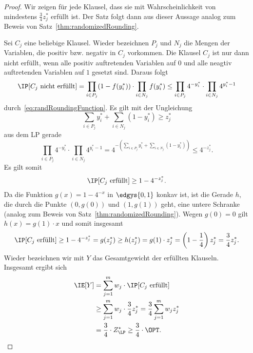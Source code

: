 \documentclass[language=ngerman,algolist]{TemplateLecture}
\begin{document}
\begin{proof}
    Wir zeigen für jede Klausel, dass sie mit Wahrscheinlichkeit von mindestens $\frac{3}{4}z_j^*$ erfüllt ist. Der Satz folgt dann aus dieser Aussage analog zum Beweis von Satz~\ref{thm:randomizedRounding}.

    Sei $C_j$ eine beliebige Klausel. Wieder bezeichnen $P_j$ und $N_j$ die Mengen der Variablen, die positiv bzw. negativ in $C_j$ vorkommen. Die Klausel $C_j$ ist nur dann nicht erfüllt, wenn alle positiv auftretenden Variablen auf $0$ und alle neagtiv auftretenden Variablen auf $1$ gesetzt sind. Daraus folgt 
    \begin{equation*}
        \IP[\text{$C_j$ nicht erfüllt}] = \prod_{i \in P_j} (1 - f(y_i^*)) \cdot \prod_{i \in N_j} f(y_i^*) \leq \prod_{i \in P_j} 4^{-y_i^*} \cdot \prod_{i \in N_j} 4^{y_i^* - 1}
    \end{equation*}
    durch~\eqref{eq:randRoundingFunction}. Es gilt mit der Ungleichung
    \begin{equation*}
        \sum_{i \in P_j} y_i^* + \sum_{i \in N_j} (1 - y_i^*) \geq z_j^*
    \end{equation*}
    aus dem LP gerade 
    \begin{equation*}
        \prod_{i \in P_j} 4^{-y_i^*} \cdot \prod_{i \in N_j} 4^{y_i^* - 1} = 4^{-\left( \sum_{i \in P_j} y_i^* + \sum_{i \in N_j} (1 - y_i^*) \right)} \leq 4^{-z_j^*}.
    \end{equation*}
    Es gilt somit 
    \begin{equation*}
        \IP[\text{$C_j$ erfüllt}] \geq 1 - 4^{-z_j^*}.
    \end{equation*}
    Da die Funktion $g(x) = 1 - 4^{-x}$ in $\edgys{0,1}$ konkav ist, ist die Gerade $h$, die durch die Punkte $(0, g(0))$ und $(1, g(1))$ geht, eine untere Schranke (analog zum Beweis von Satz~\ref{thm:randomizedRounding}). Wegen $g(0) = 0$ gilt $h(x) = g(1) \cdot x$ und somit insgesamt 
    \begin{equation*}
        \IP[\text{$C_j$ erfüllt}] \geq 1 - 4^{-z_j^*} = g(z_j^*) \geq h(z_j^*) = g(1) \cdot z_j^* = \left( 1 - \frac{1}{4} \right)z_j^* = \frac{3}{4} z_j^*.
    \end{equation*}
    Wieder bezeichnen wir mit $Y$ das Gesamtgewicht der erfüllten Klauseln. Insgesamt ergibt sich 
    \begin{equation*}
        \begin{split}
            \IE[Y] &= \sum_{j = 1}^m w_j \cdot \IP[\text{$C_j$ erfüllt}] \\
                   &\geq \sum_{j = 1}^m w_j \cdot \frac{3}{4}z_j^* = \frac{3}{4} \sum_{j = 1}^m w_j z_j^* \\
                   &= \frac{3}{4} \cdot Z^*_{\LP} \geq \frac{3}{4} \cdot \OPT. \qedhere
        \end{split}
    \end{equation*}
\end{proof}
\end{document}
